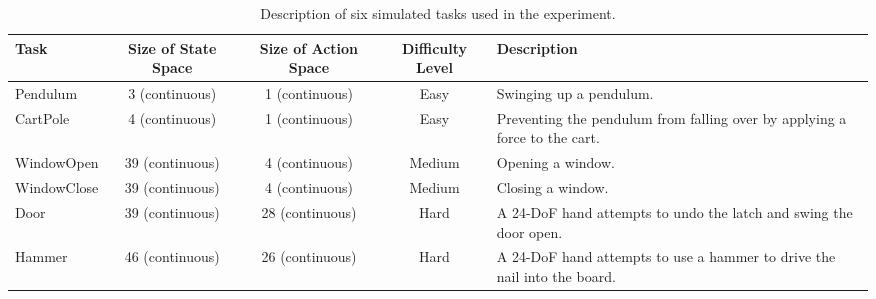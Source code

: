 \begin{landscape}
  \begin{table}[htbp!]
    \caption{Description of six simulated tasks used in the experiment.\label{ch:DTAIL:tab:Tasks}}

    \begin{tabular}{lcccp{5.5cm}}
      \toprule
      \textbf{Task}                               & \textbf{Size of State Space} & \textbf{Size of Action Space}                                              & \textbf{Difficulty Level} & \textbf{Description} \\
      \midrule
      Pendulum \cite{Env_OpenAIGym}               & 3 (continuous)               & 1 (continuous)
                                                  & Easy                         & Swinging up a pendulum.                                                                                                       \\
      CartPole \cite{Env_OpenAIGym, Env_CartPole} & 4 (continuous)               & 1 (continuous)
                                                  & Easy                         & Preventing the pendulum from falling over by applying a force to the cart.                                                    \\
      WindowOpen \cite{Env_MetaWorld}             & 39 (continuous)              & 4 (continuous)
                                                  & Medium                       & Opening a window.                                                                                                             \\
      WindowClose \cite{Env_MetaWorld}            & 39 (continuous)              & 4 (continuous)
                                                  & Medium                       & Closing a window.                                                                                                             \\
      Door \cite{Env_Adroit}                      & 39 (continuous)              & 28 (continuous)
                                                  & Hard                         & A 24-DoF hand attempts to undo the latch and swing the door open.                                                             \\
      Hammer \cite{Env_Adroit}                    & 46 (continuous)              & 26 (continuous)
                                                  & Hard                         & A 24-DoF hand attempts to use a hammer to drive the nail into the board.                                                      \\
      \bottomrule
    \end{tabular}
  \end{table}


\end{landscape}

